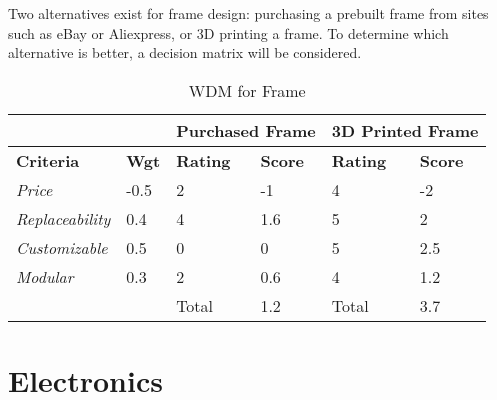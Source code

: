 \documentclass[12pt]{article}
\begin{document}
Two alternatives exist for frame design: purchasing a prebuilt frame from sites such as eBay or Aliexpress, or 3D printing a frame. To determine which alternative is better, a decision matrix will be considered.
\begin{table}[H]
\centering
\begin{tabular}{llllll}
 &  & \multicolumn{2}{l}{\cellcolor[HTML]{EFEFEF}Purchased Frame} & \multicolumn{2}{l}{\cellcolor[HTML]{EFEFEF}3D Printed Frame} \\ \hline
\rowcolor[HTML]{EFEFEF} 
\textbf{Criteria} & \textbf{Wgt} & \textbf{Rating} & \textbf{Score} & \textbf{Rating} & \textbf{Score} \\
\multicolumn{1}{l|}{\textit{Price}} & \multicolumn{1}{l|}{-0.5} & 2 & \multicolumn{1}{l|}{-1} & 4 & -2 \\
\multicolumn{1}{l|}{\textit{Replaceability}} & \multicolumn{1}{l|}{0.4} & 4 & \multicolumn{1}{l|}{1.6} & 5 & 2 \\
\multicolumn{1}{l|}{\textit{Customizable}} & \multicolumn{1}{l|}{0.5} & 0 & \multicolumn{1}{l|}{0} & 5 & 2.5 \\
\multicolumn{1}{l|}{\textit{Modular}} & \multicolumn{1}{l|}{0.3} & 2 & \multicolumn{1}{l|}{0.6} & 4 & 1.2 \\
 &  & Total & 1.2 & Total & 3.7 \\ \hline
\end{tabular}
\caption{WDM for Frame}
\label{my-label}
\end{table}



\section{Electronics}
\end{document}

